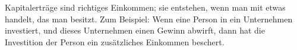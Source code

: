 Kapitalerträge sind richtiges Einkommen; sie entstehen, wenn man mit etwas handelt, das man besitzt.
Zum Beispiel: Wenn eine Person in ein Unternehmen investiert, und dieses Unternehmen einen Gewinn abwirft, dann hat die Investition der Person ein zusätzliches Einkommen beschert.